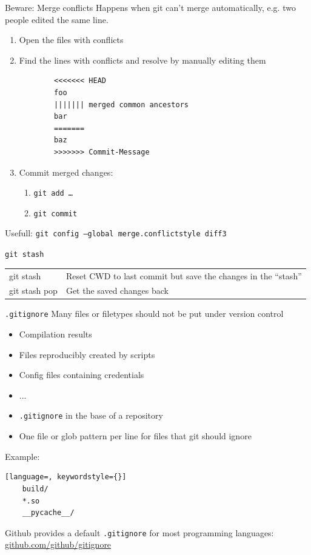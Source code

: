 \begin{frame}[fragile]{Beware: Merge conflicts}
  Happens when git can't merge automatically, e.g. two people edited the same line.

  \begin{enumerate}
    \item Open the files with conflicts
    \item Find the lines with conflicts and resolve by manually editing them
      \begin{verbatim}
        <<<<<<< HEAD
        foo
        ||||||| merged common ancestors
        bar
        =======
        baz
        >>>>>>> Commit-Message
\end{verbatim}
    \item Commit merged changes:
      \begin{enumerate}
        \item \texttt{git add …}
        \item \texttt{git commit}
      \end{enumerate}
  \end{enumerate}
  Usefull: \texttt{git config --global merge.conflictstyle diff3}
\end{frame}

\begin{frame}{\texttt{git stash}}
  \begin{tabu}{>{\ttfamily}l X[,L]}
    git stash     & Reset CWD to last commit but save the changes in the \enquote{stash} \\
    git stash pop & Get the saved changes back
  \end{tabu}
\end{frame}

\begin{frame}[fragile]{\texttt{.gitignore}}
  Many files or filetypes should not be put under version control
  \begin{itemize}
    \item Compilation results
    \item Files reproducibly created by scripts
    \item Config files containing credentials
    \item ...
  \end{itemize}

  \begin{itemize}
  \item \texttt{.gitignore} in the base of a repository
  \item One file or glob pattern per line for files that git should ignore
  \end{itemize}
  Example:
  \begin{lstlisting}[language=, keywordstyle={}]
    build/
    *.so
    __pycache__/
  \end{lstlisting}

  Github provides a default \texttt{.gitignore} for most programming languages: \href{https://github.com/github/gitignore}{github.com/github/gitignore}
\end{frame}

